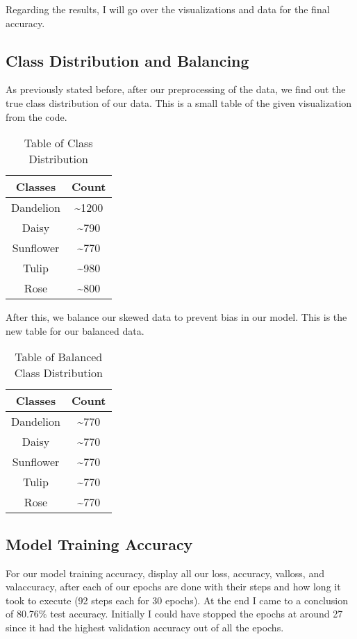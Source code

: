 \documentclass[paper=a4, fontsize=11pt,twoside]{scrartcl}
\begin{document}
Regarding the results, I will go over the visualizations and data for the final accuracy.  

\subsection{Class Distribution and Balancing}
As previously stated before, after our preprocessing of the data, we find out the true class distribution of our data. This is a small table of the given visualization from the code. 

\begin{table}[h]
    \centering
    \begin{tabular}{|c|c|}
        \hline
        \textbf{Classes} & \textbf{Count} \\
        \hline
        Dandelion & \textasciitilde 1200 \\
        Daisy & \textasciitilde 790 \\
        Sunflower & \textasciitilde 770 \\
        Tulip & \textasciitilde 980 \\
        Rose & \textasciitilde 800 \\
        \hline
    \end{tabular}
    \caption{Table of Class Distribution}
    \label{tab:xy_values}
\end{table}

After this, we balance our skewed data to prevent bias in our model. This is the new table for our balanced data. 

\begin{table}[h]
    \centering
    \begin{tabular}{|c|c|}
        \hline
        \textbf{Classes} & \textbf{Count} \\
        \hline
        Dandelion & \textasciitilde 770 \\
        Daisy & \textasciitilde 770 \\
        Sunflower & \textasciitilde 770 \\
        Tulip & \textasciitilde 770 \\
        Rose & \textasciitilde 770 \\
        \hline
    \end{tabular}
    \caption{Table of Balanced Class Distribution}
    \label{tab:xy_values}
\end{table}

\subsection{Model Training Accuracy}
For our model training accuracy, display all our loss, accuracy, val\textunderscore loss, and val\textunderscore accuracy, after each of our epochs are done with their steps and how long it took to execute (92 steps each for 30 epochs). At the end I came to a conclusion of 80.76\% test accuracy. Initially I could have stopped the epochs at around 27 since it had the highest validation accuracy out of all the epochs. 
\end{document}

